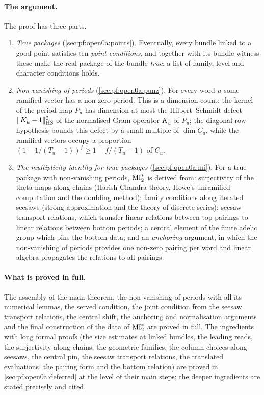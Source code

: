 \paragraph{The argument.}
The proof has three parts.
\begin{enumerate}[label=(\roman*)]
\item \emph{True packages} (\cref{sec:pf:open0a:points}). Eventually, every bundle linked to a good point satisfies
ten \emph{point conditions}, and together with its bundle witness these make the real package of the bundle
\emph{true}: a list of family, level and character conditions holds.
\item \emph{Non-vanishing of periods} (\cref{sec:pf:open0a:punz}). For every word $u$ some ramified vector has a
non-zero period. This is a dimension count: the kernel of the period map $P_u$ has dimension at most the
Hilbert--Schmidt defect $\|K_u-1\|_{\mathrm{HS}}^2$ of the normalised Gram operator $K_u$ of $P_u$; the diagonal row
hypothesis bounds this defect by a small multiple of $\dim C_u$, while the ramified vectors occupy a proportion
$(1-1/(T_u-1))^f\ge1-f/(T_u-1)$ of $C_u$.
\item \emph{The multiplicity identity for true packages} (\cref{sec:pf:open0a:mi}). For a true package with
non-vanishing periods, $\mathrm{MI}^{*}_{2}$ is derived from: surjectivity of the theta maps along chains (Harish-Chandra
theory, Howe's unramified computation and the doubling method); family conditions along iterated seesaws (strong
approximation and the theory of discrete series); seesaw transport relations, which transfer linear relations
between top pairings to linear relations between bottom periods; a central element of the finite adelic group which
pins the bottom data; and an \emph{anchoring} argument, in which the non-vanishing of periods provides one non-zero
pairing per word and linear algebra propagates the relations to all pairings.
\end{enumerate}

\paragraph{What is proved in full.}
The assembly of the main theorem, the non-vanishing of periods with all its numerical lemmas, the served condition,
the joint condition from the seesaw transport relations, the central shift, the anchoring and normalisation
arguments and the final construction of the data of $\mathrm{MI}^{*}_{2}$ are proved in full. The ingredients with long
formal proofs (the size estimates at linked bundles, the leading reads, the surjectivity along chains, the geometric
families, the column choices along seesaws, the central pin, the seesaw transport relations, the translated
evaluations, the pairing form and the bottom relation) are proved in \cref{sec:pf:open0a:deferred} at the level of
their main steps; the deeper ingredients are stated precisely and cited.

